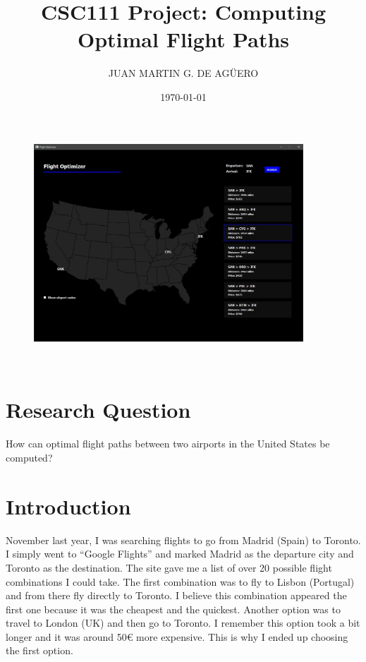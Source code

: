 \documentclass[fontsize=11pt]{article}
\title{CSC111 Project: Computing Optimal Flight Paths}
\author{JUAN MARTIN G. DE AGÜERO}
\date{\today}
\begin{document}
\maketitle

\begin{figure}
    \includegraphics[width=0.9\textwidth]{app.jpg}
\end{figure} \\


\section*{Research Question}

\noindent
How can optimal flight paths between two airports in the United States be computed?

\section*{Introduction}

\noindent
November last year, I was searching flights to go from Madrid (Spain) to Toronto. I simply went to “Google Flights” and marked Madrid as the departure city and Toronto as the destination. The site gave me a list of over 20 possible flight combinations I could take. The first combination was to fly to Lisbon (Portugal) and from there fly directly to Toronto. I believe this combination appeared the first one because it was the cheapest and the quickest. Another option was to travel to London (UK) and then go to Toronto. I remember this option took a bit longer and it was around 50€ more expensive. This is why I ended up choosing the first option. \\
\end{document}
